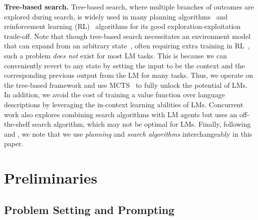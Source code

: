\documentclass{article}
\newcommand{\yxw}[1]{\textcolor{blue}{[{\bf yxw:} #1]}}
\newcommand{\kai}[1]{\textcolor{purple}{[{\bf kai:} #1]}}
\theoremstyle{plain}
\theoremstyle{definition}
\theoremstyle{remark}
\begin{document}
\textbf{Tree-based search.} Tree-based search, where multiple branches of outcomes are explored during search, is widely used in many planning algorithms~\citep{swiechowski2023monte, lavalle2001rapidly} and reinforcement learning (RL)~\citep{hafner2019learning, du2023learning, wu2023daydreamer} algorithms for its good exploration-exploitation trade-off. Note that though tree-based search necessitates an environment model that can expand from an arbitrary state~\citep{vodopivec2017monte}, often requiring extra training in RL~\citep{hafner2023mastering}, such a problem \emph{does not} exist for most LM tasks. This is because we can conveniently revert to any state by setting the input to be the context and the corresponding previous output from the LM for many tasks. Thus, we operate on the tree-based framework and use MCTS~\citep{swiechowski2023monte} to fully unlock the potential of LMs. In addition, we avoid the cost of training a value function over language descriptions by leveraging the in-context learning \citep{GPT3} abilities of LMs. Concurrent work \cite{liu2023reason} also explores combining search algorithms with LM agents but uses an off-the-shelf search algorithm, which may not be optimal for LMs. Finally, following \citet{yao2023tree} and \citet{hao2023reasoning}, we note that we use \textit{planning} and \textit{search algorithms} interchangeably in this paper.%

\section{Preliminaries}

\subsection{Problem Setting and Prompting}
\end{document}
